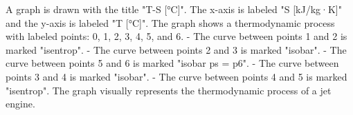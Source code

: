 A graph is drawn with the title "T-S [°C]". The x-axis is labeled "S [kJ/kg·K]" and the y-axis is labeled "T [°C]". The graph shows a thermodynamic process with labeled points: 0, 1, 2, 3, 4, 5, and 6.  
- The curve between points 1 and 2 is marked "isentrop".  
- The curve between points 2 and 3 is marked "isobar".  
- The curve between points 5 and 6 is marked "isobar ps = p6".  
- The curve between points 3 and 4 is marked "isobar".  
- The curve between points 4 and 5 is marked "isentrop".  
The graph visually represents the thermodynamic process of a jet engine.